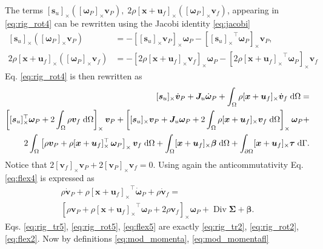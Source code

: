 \documentclass{svjour3}                     %
\DeclareMathOperator*{\Div}{Div}
\newcommand{\crmat}[1]{\ensuremath{[#1]_{\times}}}
\begin{document}
The terms $\crmat{\bm{s}_u} (\crmat{\bm{\omega}_P} \bm{v}_P), \; 2\rho \crmat{\bm{x}+\bm{u}_f} (\crmat{\bm\omega_P} {\bm{v}}_f)$, appearing in \eqref{eq:rig_rot4} can be rewritten using the Jacobi identity \eqref{eq:jacobi}
\begin{align}
	\crmat{\bm{s}_u} (\crmat{\bm{\omega}_P} \bm{v}_P) &= - \crmat{\crmat{\bm{s}_u} \bm{v}_P} \bm{\omega}_P - \crmat{\crmat{\bm{s}_u}^\top \bm{\omega}_P} \bm{v}_P, \\
	2\rho \crmat{\bm{x}+\bm{u}_f} (\crmat{\bm\omega_P} {\bm{v}}_f) &= - \crmat{2\rho \crmat{\bm{x}+\bm{u}_f} \bm{v}_f} \bm\omega_P - \crmat{2\rho \crmat{\bm{x}+\bm{u}_f}^\top \bm\omega_P} \bm{v}_f
\end{align}
Eq. \eqref{eq:rig_rot4} is then rewritten as
\begin{equation}
\label{eq:rig_rot5}
\begin{split}
\crmat{\bm{s}_u} \dot{\bm{v}}_P  + \bm{J}_u \dot{\bm\omega}_P + \int_{\Omega} \rho \crmat{\bm{x}+\bm{u}_f} \dot{\bm{v}}_f \d{\Omega} = \\
\left[\crmat{\bm{s}_u}^\top \bm\omega_P + 2 \int_{\Omega} \rho \bm{v}_f \d{\Omega} \right]_\times \bm{v}_P + \left[\crmat{\bm{s}_u} \bm{v}_P + \bm{J}_u \bm\omega_P + 2 \int_{\Omega} \rho \crmat{\bm{x}+\bm{u}_f} {\bm{v}}_f \d{\Omega} \right]_\times \bm\omega_P + 
\\
2 \int_{\Omega} \left[\rho \bm{v}_P + \rho \crmat{\bm{x}+\bm{u}_f}^\top \, \bm\omega_P \right]_\times \bm{v}_f \d{\Omega} + \int_{\Omega}\crmat{\bm{x}+\bm{u}_f} \bm\beta \d{\Omega} + \int_{\partial \Omega}\crmat{\bm{x}+\bm{u}_f} \bm{\tau} \d{\Gamma}.
\end{split}
\end{equation}
Notice that $2 \crmat{\bm{v}_f}\bm{v}_P + 2 \crmat{\bm{v}_P}\bm{v}_f = 0$. Using again the anticommutativity Eq. \eqref{eq:flex4} is expressed as 
\begin{equation}
\label{eq:flex5}
\begin{split}
\rho \dot{\bm{v}}_P + \rho \crmat{\bm{x}+\bm{u}_f}^\top \dot{\bm\omega}_P  + \rho \dot{\bm{v}}_f = \\
\left[\rho \bm{v}_P + \rho \crmat{\bm{x}+\bm{u}_f}^\top \bm\omega_P + 2 \rho \bm{v}_f \right]_\times \bm\omega_P + \Div{\bm\Sigma} + \bm\beta.
\end{split}
\end{equation}
Eqs. \eqref{eq:rig_tr5}, \eqref{eq:rig_rot5}, \eqref{eq:flex5} are exactly \eqref{eq:rig_tr2}, \eqref{eq:rig_rot2}, \eqref{eq:flex2}. Now by definitions \eqref{eq:mod_momenta}, \eqref{eq:mod_momentafl}
\end{document}
